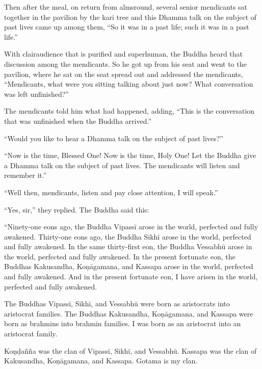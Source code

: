 \documentclass[12pt,openany]{book}%
\begin{document}
Then after the meal, on return from almsround, several senior mendicants sat together in the pavilion by the kari tree and this Dhamma talk on the subject of past lives came up among them, “So it was in a past life; such it was in a past life.” 

With clairaudience that is purified and superhuman, the Buddha heard that discussion among the mendicants. So he got up from his seat and went to the pavilion, where he sat on the seat spread out and addressed the mendicants, “Mendicants, what were you sitting talking about just now? What conversation was left unfinished?” 

The mendicants told him what had happened, adding, “This is the conversation that was unfinished when the Buddha arrived.” 

“Would you like to hear a Dhamma talk on the subject of past lives?” 

“Now is the time, Blessed One! Now is the time, Holy One! Let the Buddha give a Dhamma talk on the subject of past lives. The mendicants will listen and remember it.” 

“Well then, mendicants, listen and pay close attention, I will speak.” 

“Yes, sir,” they replied. The Buddha said this: 

“Ninety-one eons ago, the Buddha \textsanskrit{Vipassī} arose in the world, perfected and fully awakened. Thirty-one eons ago, the Buddha \textsanskrit{Sikhī} arose in the world, perfected and fully awakened. In the same thirty-first eon, the Buddha \textsanskrit{Vessabhū} arose in the world, perfected and fully awakened. In the present fortunate eon, the Buddhas Kakusandha, \textsanskrit{Koṇāgamana}, and Kassapa arose in the world, perfected and fully awakened. And in the present fortunate eon, I have arisen in the world, perfected and fully awakened. 

The Buddhas \textsanskrit{Vipassī}, \textsanskrit{Sikhī}, and \textsanskrit{Vessabhū} were born as aristocrats into aristocrat families. The Buddhas Kakusandha, \textsanskrit{Koṇāgamana}, and Kassapa were born as brahmins into brahmin families. I was born as an aristocrat into an aristocrat family. 

\textsanskrit{Koṇḍañña} was the clan of \textsanskrit{Vipassī}, \textsanskrit{Sikhī}, and \textsanskrit{Vessabhū}. Kassapa was the clan of Kakusandha, \textsanskrit{Koṇāgamana}, and Kassapa. Gotama is my clan. 
\end{document}

